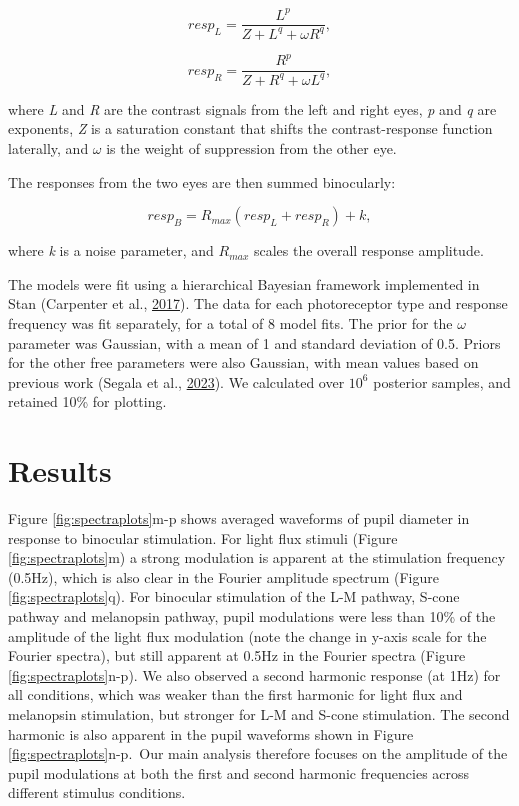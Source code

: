 \documentclass[
]{article}
\begin{document}
\begin{equation}
\label{eq:respL}
resp_L = \frac{L^p}{Z + L^q + \omega R^q},
\end{equation}

\begin{equation}
\label{eq:respR}
resp_R = \frac{R^p}{Z + R^q + \omega L^q},
\end{equation}

\noindent where \emph{L} and \emph{R} are the contrast signals from the left and right eyes, \emph{p} and \emph{q} are exponents, \emph{Z} is a saturation constant that shifts the contrast-response function laterally, and \(\omega\) is the weight of suppression from the other eye.

The responses from the two eyes are then summed binocularly:

\begin{equation}
\label{eq:respB}
resp_B = R_{max}(resp_L + resp_R) + k,
\end{equation}

\noindent where \emph{k} is a noise parameter, and \(R_{max}\) scales the overall response amplitude.

The models were fit using a hierarchical Bayesian framework implemented in Stan (Carpenter et al., \protect\hyperlink{ref-Carpenter2017}{2017}). The data for each photoreceptor type and response frequency was fit separately, for a total of 8 model fits. The prior for the \(\omega\) parameter was Gaussian, with a mean of 1 and standard deviation of 0.5. Priors for the other free parameters were also Gaussian, with mean values based on previous work (Segala et al., \protect\hyperlink{ref-Segala2023}{2023}). We calculated over \ensuremath{10^{6}} posterior samples, and retained 10\% for plotting.

\hypertarget{results}{%
\section{Results}\label{results}}

Figure \ref{fig:spectraplots}m-p shows averaged waveforms of pupil diameter in response to binocular stimulation. For light flux stimuli (Figure \ref{fig:spectraplots}m) a strong modulation is apparent at the stimulation frequency (0.5Hz), which is also clear in the Fourier amplitude spectrum (Figure \ref{fig:spectraplots}q). For binocular stimulation of the L-M pathway, S-cone pathway and melanopsin pathway, pupil modulations were less than 10\% of the amplitude of the light flux modulation (note the change in y-axis scale for the Fourier spectra), but still apparent at 0.5Hz in the Fourier spectra (Figure \ref{fig:spectraplots}n-p). We also observed a second harmonic response (at 1Hz) for all conditions, which was weaker than the first harmonic for light flux and melanopsin stimulation, but stronger for L-M and S-cone stimulation. The second harmonic is also apparent in the pupil waveforms shown in Figure \ref{fig:spectraplots}n-p.~Our main analysis therefore focuses on the amplitude of the pupil modulations at both the first and second harmonic frequencies across different stimulus conditions.
\end{document}
